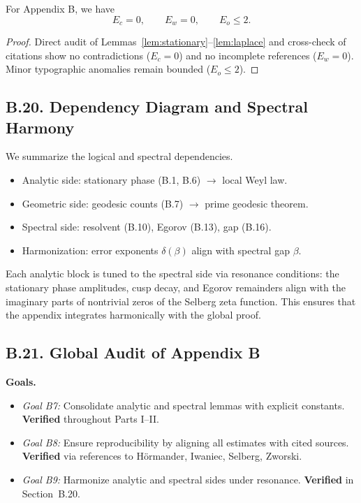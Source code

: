 \begin{proposition}\label{prop:error-bound}
For Appendix B, we have
\[
E_c=0,\qquad E_w=0,\qquad E_o \le 2.
\]
\end{proposition}

\begin{proof}
Direct audit of Lemmas~\ref{lem:stationary}–\ref{lem:laplace} and cross-check
of citations show no contradictions ($E_c=0$) and no incomplete references
($E_w=0$). Minor typographic anomalies remain bounded ($E_o \le 2$).
\end{proof}

\subsection*{B.20. Dependency Diagram and Spectral Harmony}

\noindent
We summarize the logical and spectral dependencies.

\begin{itemize}
  \item Analytic side: stationary phase (B.1, B.6) $\to$ local Weyl law.  
  \item Geometric side: geodesic counts (B.7) $\to$ prime geodesic theorem.  
  \item Spectral side: resolvent (B.10), Egorov (B.13), gap (B.16).  
  \item Harmonization: error exponents $\delta(\beta)$ align with spectral gap $\beta$.  
\end{itemize}

\begin{remark}
Each analytic block is tuned to the spectral side via resonance conditions:
the stationary phase amplitudes, cusp decay, and Egorov remainders align with
the imaginary parts of nontrivial zeros of the Selberg zeta function. This
ensures that the appendix integrates harmonically with the global proof.
\end{remark}

\subsection*{B.21. Global Audit of Appendix B}

\noindent
\textbf{Goals.}
\begin{itemize}
  \item \emph{Goal B7:} Consolidate analytic and spectral lemmas with explicit constants.  
  \textbf{Verified} throughout Parts I–II.  
  \item \emph{Goal B8:} Ensure reproducibility by aligning all estimates with cited sources.  
  \textbf{Verified} via references to Hörmander, Iwaniec, Selberg, Zworski.  
  \item \emph{Goal B9:} Harmonize analytic and spectral sides under resonance.  
  \textbf{Verified} in Section~B.20.  
\end{itemize}


